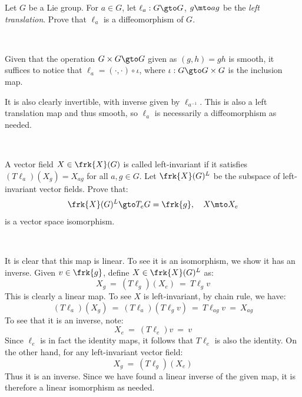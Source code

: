 \documentclass[14pt]{extarticle}
\begin{document}
\start

\begin{qu}[num=6.16a]
	Let $G$ be a Lie group.
	For $a\in G$, let $\ell_{a}:G\gto G$, $g\mto ag$ be the \textit{left translation}.
	Prove that $\ell_{a}$ is a diffeomorphism of $G$.
\end{qu} \

\begin{soln}
	Given that the operation $G\times G\gto G$ given as $(g,h)=gh$ is smooth,
	it suffices to notice that $\ell_{a}=(\cdot,\cdot)\circ\iota$, where
	$\iota:G\gto G\times G$ is the inclusion map.

	It is also clearly invertible, with inverse given by $\ell_{a^{-1}}$.
	This is also a left translation map and thus smooth, so $\ell_{a}$ is
	necessarily a diffeomorphism as needed.
\end{soln} \

\begin{qu}[num=6.16b]
	A vector field $X\in\frk{X}(G)$ is called left-invariant if it satisfies
	$(T\ell_{a})(X_{g}) = X_{ag}$ for all $a,g\in G$.
	Let $\frk{X}(G)^{L}$ be the subspace of left-invariant vector fields.
	Prove that:
	\begin{equation*}
		\frk{X}(G)^{L} \gto T_{e}G = \frk{g}, \quad X\mto X_{e}
	\end{equation*}
	is a vector space isomorphism.
\end{qu} \

\begin{soln}
	It is clear that this map is linear.
	To see it is an isomorphism, we show it has an inverse.
	Given $v\in\frk{g}$, define $X\in\frk{X}(G)^{L}$ as:
	\begin{equation*}
		X_{g} \ = \ (T\ell_{g})(X_{e}) \ = \ T\ell_{g}v
	\end{equation*}
	This is clearly a linear map.
	To see $X$ is left-invariant, by chain rule, we have:
	\begin{equation*}
		(T\ell_{a})(X_{g}) \ = \ (T\ell_{a})(T\ell_{g}v)
		\ = \ T\ell_{ag}v \ = \ X_{ag}
	\end{equation*}
	To see that it is an inverse, note:
	\begin{equation*}
		X_{e} \ = \ (T\ell_{e})v \ = \ v
	\end{equation*}
	Since $\ell_{e}$ is in fact the identity maps, it follows that $T\ell_{e}$ is
	also the identity.
	On the other hand, for any left-invariant vector field:
	\begin{equation*}
		X_{g} \ = \ (T\ell_{g})(X_{e})
	\end{equation*}
	Thus it is an inverse.
	Since we have found a linear inverse of the given map, it is therefore a
	linear isomorphism as needed.
\end{soln} \
\end{document}
